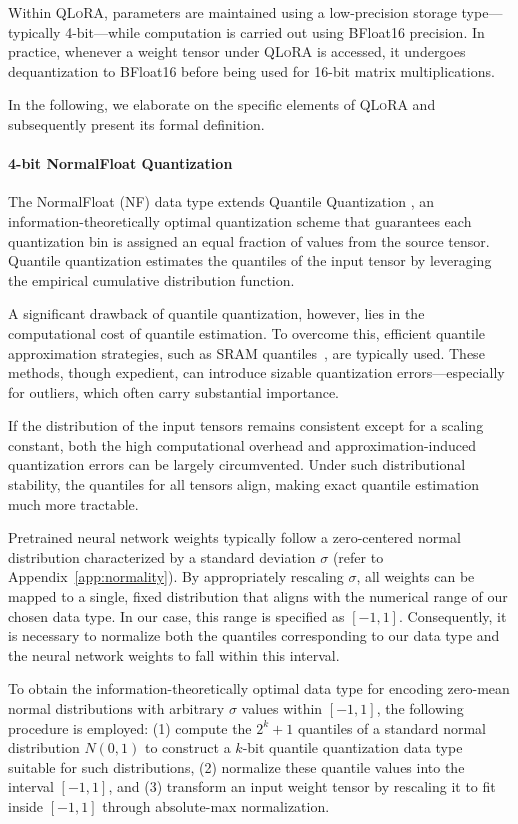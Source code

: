 Within \textsc{QLoRA}, parameters are maintained using a low-precision storage type—typically 4-bit—while computation is carried out using BFloat16 precision. In practice, whenever a weight tensor under \textsc{QLoRA} is accessed, it undergoes dequantization to BFloat16 before being used for 16-bit matrix multiplications.

In the following, we elaborate on the specific elements of \textsc{QLoRA} and subsequently present its formal definition.

\paragraph{4-bit NormalFloat Quantization} The NormalFloat (NF) data type extends Quantile Quantization \citep{dettmers2022optimizers}, an information-theoretically optimal quantization scheme that guarantees each quantization bin is assigned an equal fraction of values from the source tensor. Quantile quantization estimates the quantiles of the input tensor by leveraging the empirical cumulative distribution function.

A significant drawback of quantile quantization, however, lies in the computational cost of quantile estimation. To overcome this, efficient quantile approximation strategies, such as SRAM quantiles~\citep{dettmers2022optimizers}, are typically used. These methods, though expedient, can introduce sizable quantization errors—especially for outliers, which often carry substantial importance.

If the distribution of the input tensors remains consistent except for a scaling constant, both the high computational overhead and approximation-induced quantization errors can be largely circumvented. Under such distributional stability, the quantiles for all tensors align, making exact quantile estimation much more tractable.

Pretrained neural network weights typically follow a zero-centered normal distribution characterized by a standard deviation $\sigma$ (refer to Appendix~\ref{app:normality}). By appropriately rescaling $\sigma$, all weights can be mapped to a single, fixed distribution that aligns with the numerical range of our chosen data type. In our case, this range is specified as $[-1, 1]$. Consequently, it is necessary to normalize both the quantiles corresponding to our data type and the neural network weights to fall within this interval.

To obtain the information-theoretically optimal data type for encoding zero-mean normal distributions with arbitrary $\sigma$ values within $[-1, 1]$, the following procedure is employed: (1) compute the $2^k+1$ quantiles of a standard normal distribution $N(0, 1)$ to construct a $k$-bit quantile quantization data type suitable for such distributions, (2) normalize these quantile values into the interval $[-1, 1]$, and (3) transform an input weight tensor by rescaling it to fit inside $[-1, 1]$ through absolute-max normalization.

